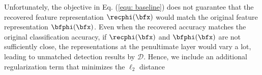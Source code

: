 Unfortunately, the objective in Eq. (\ref{equ: baseline}) does not guarantee that the recovered feature representation $\recphi(\bfx)$ would match the original feature representation $\bfphi(\bfx)$.
Even when the recovered accuracy matches the original classification accuracy, if $\recphi(\bfx)$ and $\bfphi(\bfx)$ are not sufficiently close, the representations at the penultimate layer would vary a lot, leading to unmatched detection results by $\mathcal{D}$.
Hence, we include an additional regularization term that minimizes the $\ell_2$ distance 

%
%

